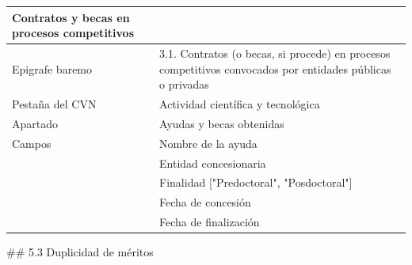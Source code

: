 \documentclass{article}
\begin{document}
\begin{itemize}
\begin{itemize}
\begin{scriptsize}
                  \vspace{0.4cm}
                  \begin{table}[h!]\centering\renewcommand{\arraystretch}{1.3}
                    \begin{tabular}{|p{}|p{}|}\hline
                      Contratos y becas en procesos competitivos &                                                                                                            \\\hline
                      Epigrafe baremo                            & 3.1. Contratos (o becas, si procede) en procesos competitivos convocados por entidades públicas o privadas \\\hline
                      Pestaña del CVN                            & Actividad científica y tecnológica                                                                         \\\hline
                      Apartado                                   & Ayudas y becas obtenidas                                                                                   \\\hline
                      Campos                                     & Nombre de la ayuda                                                                                         \\\hline
                                                                 & Entidad concesionaria                                                                                      \\\hline
                                                                 & Finalidad ["Predoctoral", "Posdoctoral"]                                                                   \\\hline
                                                                 & Fecha de concesión                                                                                         \\\hline
                                                                 & Fecha de finalización                                                                                      \\\hline
                    \end{tabular}\end{table}
                  \vspace{0.4cm}

                  \#\# 5.3 Duplicidad de méritos


\end{scriptsize}
\end{itemize}
\end{itemize}
\end{document}
